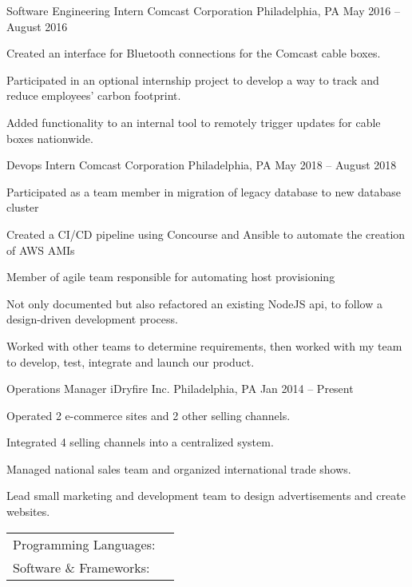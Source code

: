 \documentclass[]{awesome-cv}
\begin{document}
\vspace{-2mm}
\begin{cventries}
	\cventry
	{Software Engineering Intern}
	{Comcast Corporation}
	{Philadelphia, PA}
	{May 2016 – August 2016}
	{\begin{cvitems}
		\item {Created an interface for Bluetooth connections for the Comcast cable boxes.}
		\item {Participated in an optional internship project to develop a way to track and reduce employees’ carbon footprint.}
		\item {Added functionality to an internal tool to remotely trigger updates for cable boxes nationwide.}
		\end{cvitems}}
	\cventry
	{Devops Intern}
	{Comcast Corporation}
	{Philadelphia, PA}
	{May 2018 – August 2018}
	{\begin{cvitems}
		\item {Participated as a team member in migration of legacy database to new database cluster}
		\item {Created a CI/CD pipeline using Concourse and Ansible to automate the creation of AWS AMIs}
		\item {Member of agile team responsible for automating host provisioning}
		\item {Not only documented but also refactored an existing NodeJS api, to follow a design-driven development process.}
		\item {Worked with other teams to determine requirements, then worked with my team to develop, test, integrate and launch our product.}
		\end{cvitems}}
	\cventry
	{Operations Manager}
	{iDryfire Inc.}
	{Philadelphia, PA}
	{Jan 2014 – Present}
	{\begin{cvitems}
		\item {Operated 2 e-commerce sites and 2 other selling channels.}
		\item {Integrated 4 selling channels into a centralized system.}
		\item {Managed national sales team and organized international trade shows.}
		\item {Lead small marketing and development team to design advertisements and create websites.}
		\end{cvitems}}
\end{cventries}
\begin{cventries}
	\cventry
	{}
	{\def\arraystretch{1.15}{\begin{tabular}{ l l }
		Programming Languages:  & {\skill{ Javascript, Python, C/C++}} \\
		Software \& Frameworks:  & {\skill{ Git, Ansible, Concourse (CI/CD, NodeJS, AWS, MySQL, PostgreSQL, MongoDB}} \\
		\end{tabular}}}
	{}
	{}
	{}
\end{cventries}

\vspace{-7mm}


\ 
\end{document}
